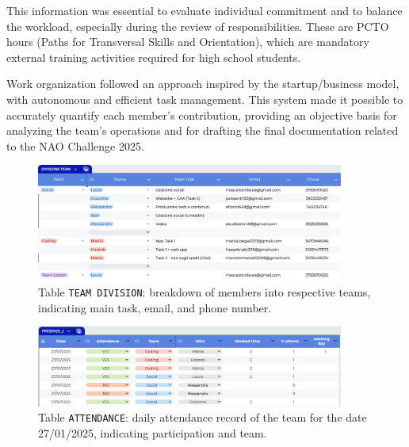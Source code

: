 \documentclass{optica-article}
\begin{document}
\begin{abstract*}
This information was essential to evaluate individual commitment and to balance the workload, especially during the review of responsibilities. These are PCTO hours (Paths for Transversal Skills and Orientation), which are mandatory external training activities required for high school students.

Work organization followed an approach inspired by the startup/business model, with autonomous and efficient task management. This system made it possible to accurately quantify each member's contribution, providing an objective basis for analyzing the team's operations and for drafting the final documentation related to the NAO Challenge 2025.


\begin{figure}[H]
    \centering
    \includegraphics[width=0.9\textwidth]{figures/divisione_team.png}
    \caption{Table \texttt{TEAM DIVISION}: breakdown of members into respective teams, indicating main task, email, and phone number.}
    \label{fig:divisione_team}
\end{figure}

\begin{figure}[H]
    \centering
    \includegraphics[width=0.9\textwidth]{figures/file_presenze.png}
    \caption{Table \texttt{ATTENDANCE}: daily attendance record of the team for the date 27/01/2025, indicating participation and team.}
    \label{fig:presenze}
\end{figure}

\bigskip

\noindent

\end{abstract*}

\end{document}
